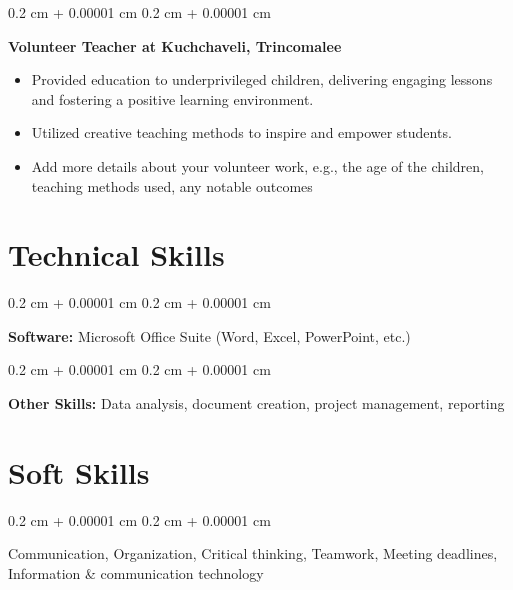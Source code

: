 \documentclass[10pt, letterpaper]{article}
\newenvironment{highlights}{
    \begin{itemize}[
        topsep=0.10 cm,
        parsep=0.10 cm,
        partopsep=0pt,
        itemsep=0pt,
        leftmargin=0.4 cm + 10pt
    ]
}{
    \end{itemize}
} %
\newenvironment{onecolentry}{
    \begin{adjustwidth}{
        0.2 cm + 0.00001 cm
    }{
        0.2 cm + 0.00001 cm
    }
}{
    \end{adjustwidth}
} %
\newenvironment{twocolentry}[2][]{
    \onecolentry
    \def\secondColumn{#2}
    \setcolumnwidth{\fill, 4.5 cm}
    \begin{paracol}{2}
    }{
    \switchcolumn \raggedleft \secondColumn
    \end{paracol}
    \endonecolentry
} %
\begin{document}
\vspace{0.2 cm}

\begin{twocolentry}{
    2018
}
    \textbf{Volunteer Teacher at Kuchchaveli, Trincomalee}
    \begin{highlights}
        \item Provided education to underprivileged children, delivering engaging lessons and fostering a positive learning environment.
        \item Utilized creative teaching methods to inspire and empower students.
        \item [Add more details about your volunteer work, e.g., the age of the children, teaching methods used, any notable outcomes]
    \end{highlights}
\end{twocolentry}





    
    \section{Technical Skills}

        \begin{onecolentry}
            \textbf{Software:} Microsoft Office Suite (Word, Excel, PowerPoint, etc.)
        \end{onecolentry}

        \vspace{0.2 cm}

        \begin{onecolentry}
            \textbf{Other Skills:} Data analysis, document creation, project management, reporting
        \end{onecolentry}


    
    \section{Soft Skills}

        \begin{onecolentry}
            Communication, Organization, Critical thinking, Teamwork, Meeting deadlines, Information & communication technology
        \end{onecolentry}
\end{document}
